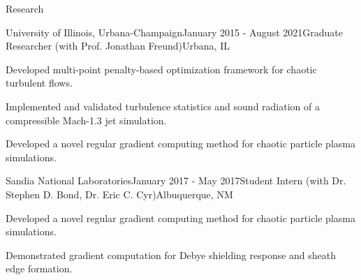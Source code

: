 \documentclass{resume} %
\begin{document}
\begin{rSection}{Research}
\begin{rSubsection}{University of Illinois, Urbana-Champaign}{January 2015 - August 2021}{Graduate Researcher \textnormal{(with Prof. Jonathan Freund)}}{Urbana, IL}
\item Developed multi-point penalty-based optimization framework for chaotic turbulent flows.
\item Implemented and validated turbulence statistics and sound radiation of a compressible Mach-1.3 jet simulation.
\item Developed a novel regular gradient computing method for chaotic particle plasma simulations.
\end{rSubsection}

\begin{rSubsection}{Sandia National Laboratories}{January 2017 - May 2017}{Student Intern \textnormal{(with Dr. Stephen D. Bond, Dr. Eric C. Cyr)}}{Albuquerque, NM}
\item Developed a novel regular gradient computing method for chaotic particle plasma simulations.
\item Demonstrated gradient computation for Debye shielding response and sheath edge formation.
\end{rSubsection}

\end{rSection}
\end{document}
